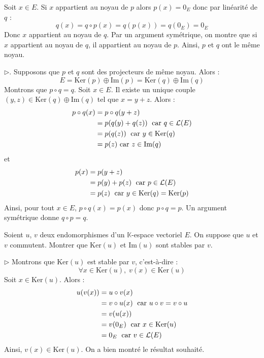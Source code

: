 \documentclass[a4paper,10pt]{report}
\begin{document}
\medskip

\noindent Soit $x \in E$. Si $x$ appartient au noyau de $p$ alors $p(x) = 0_E$ donc par linéarité de $q$ :
$$ q(x)= q \circ p(x) = q(p(x))=q(0_E) = 0_E$$
Donc $x$ appartient au noyau de $q$. Par un argument symétrique, on montre que si $x$ appartient au noyau de $q$, il appartient au noyau de $p$. Ainsi, $p$ et $q$ ont le même noyau.

\medskip

\noindent $\rhd$. Supposons que $p$ et $q$ sont des projecteurs de même noyau. Alors :
$$ E = \textrm{Ker}(p) \oplus \textrm{Im}(p) = \textrm{Ker}(q) \oplus \textrm{Im}(q)$$
Montrons que $p \circ q= q$. Soit $x \in E$. Il existe un unique couple $(y,z) \in \textrm{Ker}(q) \oplus \textrm{Im}(q)$ tel que $x=y+z$. Alors :
\begin{align*}
p \circ q(x) & = p\circ q (y+z) \\
& = p (q(y)+q(z))  \; \hbox{ car } q \in \mathcal{L}(E) \\
& = p (q(z))   \; \hbox{ car } y \in \textrm{Ker}(q) \\
& = p(z) \hbox{ car } z \in \textrm{Im}(q)
\end{align*}
et 
\begin{align*}
p(x) & = p(y+z) \\
& = p(y)+p(z) \; \hbox{ car } p \in \mathcal{L}(E) \\
& =  p(z) \; \hbox{ car } y \in \textrm{Ker}(q) = \textrm{Ker}(p)
\end{align*}
Ainsi, pour tout $x \in E$, $p \circ q(x)=p(x)$ donc $p \circ q = p$. Un argument symétrique donne $q \circ p = q$.

\begin{Exercice}{} Soient $u$, $v$ deux endomorphismes d'un $\mathbb{K}$-espace vectoriel $E$. On suppose que $u$ et $v$ commutent. Montrer que $\textrm{Ker}(u)$ et $\textrm{Im}(u)$ sont stables par $v$.
\end{Exercice} 

\corr 

\noindent $\rhd$ Montrons que $\textrm{Ker}(u)$ est stable par $v$, c'est-à-dire :
$$ \forall x \in \textrm{Ker}(u), \; v(x) \in \textrm{Ker}(u)$$
Soit $x \in \textrm{Ker}(u)$. Alors :
\begin{align*}
u (v(x)) & = u \circ v (x) \\
& = v \circ u (x) \; \hbox{ car } u \circ v = v \circ u \\
& = v(u(x)) \\
& = v(0_E) \; \hbox{ car } x \in \textrm{Ker}(u) \\
& = 0_E \; \hbox{ car } v \in \mathcal{L}(E)
\end{align*}
Ainsi, $v(x) \in \textrm{Ker}(u)$. On a bien montré le résultat souhaité.
\end{document}
